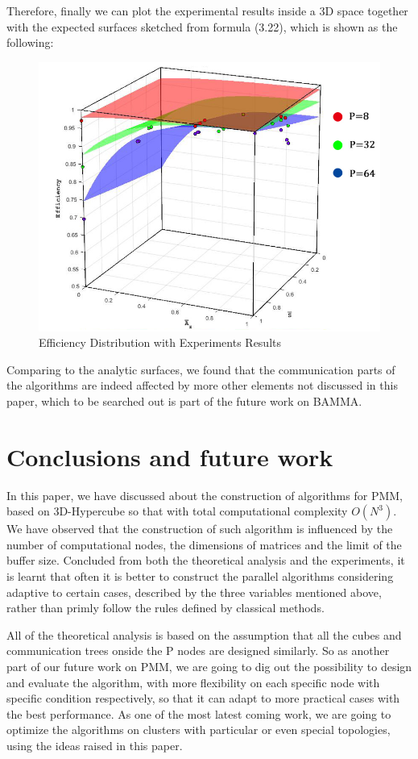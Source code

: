 \documentclass{amsart}
\theoremstyle{definition}
\theoremstyle{remark}
\numberwithin{equation}{section}
\begin{document}
Therefore, finally we can plot the experimental results inside a 3D space together with the expected surfaces sketched from formula (3.22), which is shown as the following:
\begin{figure}[h]
	\includegraphics[scale=0.7]{figures/Efficieny.png}
	\caption{Efficiency Distribution with Experiments Results}
\end{figure}


Comparing to the analytic surfaces, we found that the communication parts of the algorithms are indeed affected by more other elements not discussed in this paper, which to be searched out is part of the future work on BAMMA.
\section{Conclusions and future work}
	In this paper, we have discussed about the construction of algorithms for PMM, based on 3D-Hypercube so that with total computational complexity $O(N^3)$. We have observed that the construction of such algorithm is influenced by the number of computational nodes, the dimensions of matrices and the limit of the buffer size. Concluded from both the theoretical analysis and the experiments, it is learnt that often it is better to construct the parallel algorithms considering adaptive to certain cases, described by the three variables mentioned above, rather than primly follow the rules defined by classical methods.
	
	All of the theoretical analysis is based on the assumption that all the cubes and communication trees onside the P nodes are designed similarly. So as another part of our future work on PMM, we are going to dig out the possibility to design and evaluate the algorithm, with more flexibility on each specific node with specific condition respectively, so that it can adapt to more practical cases with the best performance. As one of the most latest coming work, we are going to optimize the algorithms on clusters with particular or even special topologies, using the ideas raised in this paper.
	
\end{document}
